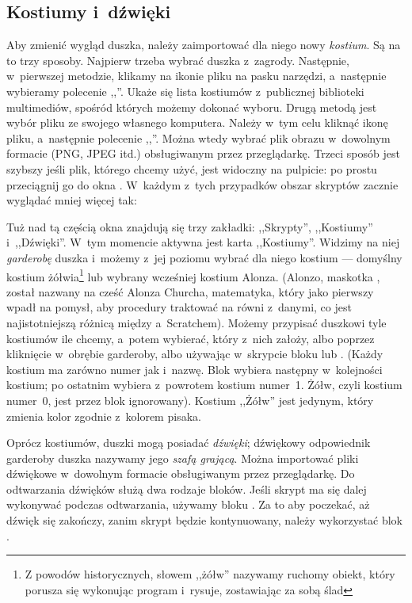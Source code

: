 \documentclass[a4paper]{report}
\begin{document}
\subsection{Kostiumy i~dźwięki}

Aby zmienić wygląd duszka, należy zaimportować dla niego nowy \emph{kostium}. Są na to trzy sposoby. Najpierw trzeba wybrać duszka z~zagrody. Następnie, w~pierwszej metodzie, klikamy na ikonie pliku  na pasku narzędzi, a~następnie wybieramy polecenie ,,''. Ukaże się lista kostiumów z~publicznej biblioteki multimediów, spośród których możemy dokonać wyboru. Drugą metodą jest wybór pliku ze swojego własnego komputera. Należy w~tym celu kliknąć ikonę pliku, a~następnie polecenie ,,''. Można wtedy wybrać plik obrazu w~dowolnym formacie (PNG, JPEG itd.) obsługiwanym przez przeglądarkę. Trzeci sposób jest szybszy jeśli plik, którego chcemy użyć, jest widoczny na pulpicie: po prostu przeciągnij go do okna . W~każdym z~tych przypadków obszar skryptów zacznie wyglądać mniej więcej tak:\nopagebreak


Tuż nad tą częścią okna znajdują się trzy zakładki: ,,Skrypty'', ,,Kostiumy'' i~,,Dźwię\-ki''. W~tym momencie aktywna jest karta ,,Kostiumy''. Widzimy na niej \emph{garderobę} duszka i~możemy z~jej poziomu wybrać dla niego kostium --- domyślny kostium żółwia\footnote{Z powodów historycznych, słowem ,,żółw'' nazywamy ruchomy obiekt, który porusza się wykonując program i~rysuje, zostawiając za sobą ślad} lub wybrany wcześniej kostium Alonza. (Alonzo, maskotka , został nazwany na cześć Alonza Churcha, matematyka, który jako pierwszy wpadł na pomysł, aby procedury traktować na równi z~danymi, co jest najistotniejszą różnicą między  a~Scratchem). Możemy przypisać duszkowi tyle kostiumów ile chcemy, a~potem wybierać, który z~nich założy, albo poprzez kliknięcie w~obrębie garderoby, albo używając w~skrypcie bloku  lub . (Każdy kostium ma zarówno numer jak i~nazwę. Blok  wybiera następny w~kolejności kostium; po ostatnim wybiera z~powrotem kostium numer~1. Żółw, czyli kostium numer~0, jest przez blok  ignorowany). Kostium ,,Żółw'' jest jedynym, który zmienia kolor zgodnie z~kolorem pisaka.

Oprócz kostiumów, duszki mogą posiadać \emph{dźwięki}; dźwiękowy odpowiednik garderoby duszka nazywamy jego \emph{szafą grającą}. Można importować pliki dźwiękowe w~dowolnym formacie obsługiwanym przez przeglądarkę. Do odtwarzania dźwięków służą dwa rodzaje bloków. Jeśli skrypt ma się dalej wykonywać podczas odtwarzania, używamy bloku . Za to aby poczekać, aż dźwięk się zakończy, zanim skrypt będzie kontynuowany, należy wykorzystać blok .
\end{document}
